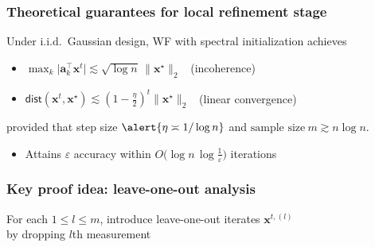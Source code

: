 \documentclass[compress,
mathserif,wide,%
]{beamer}
\begin{document}
\begin{frame}
	\frametitle{Theoretical guarantees for local refinement stage}



\begin{theorem}
Under i.i.d.~Gaussian design, WF with spectral initialization achieves 
\begin{itemize}
	\itemsep0.3em
	\item $  \max_k \big| \bm{a}_k^{\top} \bm{x}^{t}  \big | \lesssim \sqrt{\log n} \, \| \bm{x}^{\star} \|_2$ ~(incoherence)
	\pause
	\item 
		$\mathsf{dist}(\bm{x}^{t}, \bm{x}^\star) \lesssim \left(1-\frac{\eta}{2}\right)^{t} \|\bm{x}^\star\|_{2}$ ~(linear convergence)
\end{itemize}
provided that step size $\alert{\eta \asymp 1/ \log n}$ and
$ \text{sample size}~ m \gtrsim n\log n $.
\end{theorem}



\vfill

\begin{itemize}
	\itemsep0.5em
	\item Attains $\varepsilon$ accuracy within $O\big(\log n \,\log \frac{1}{\varepsilon}\big)$ iterations
\end{itemize}

\end{frame}





\begin{frame}
	\frametitle{Key proof idea: leave-one-out analysis}
For each $1\leq l\leq m$, introduce leave-one-out iterates $\bm{x}^{t,(l)}$ \\ by dropping $l$th measurement
\vfill
{}

\end{frame}
\end{document}

